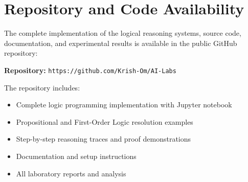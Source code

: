 \documentclass[11pt,a4paper]{article}
\begin{document}
\section{Repository and Code Availability}

The complete implementation of the logical reasoning systems, source code, documentation, and experimental results is available in the public GitHub repository:

\textbf{Repository:} \texttt{https://github.com/Krish-Om/AI-Labs}

The repository includes:
\begin{itemize}
\item Complete logic programming implementation with Jupyter notebook
\item Propositional and First-Order Logic resolution examples
\item Step-by-step reasoning traces and proof demonstrations
\item Documentation and setup instructions
\item All laboratory reports and analysis
\end{itemize}
\end{document}
